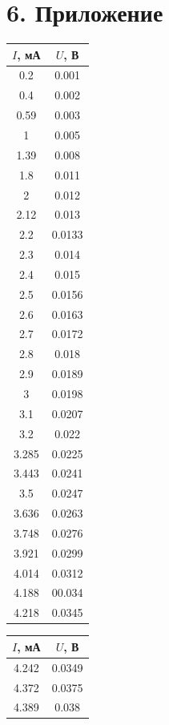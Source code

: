 \documentclass[a4paper,12pt]{report}
\begin{document}
\newpage
\section*{6. Приложение}
\begin{table}[H]
\begin{tabular}{|c|c|}
\hline
$I$, мА & $U$, В   \\ \hline
0.2   & 0.001  \\ \hline
0.4   & 0.002  \\ \hline
0.59  & 0.003  \\ \hline
1     & 0.005  \\ \hline
1.39  & 0.008  \\ \hline
1.8   & 0.011  \\ \hline
2     & 0.012  \\ \hline
2.12  & 0.013  \\ \hline
2.2   & 0.0133 \\ \hline
2.3   & 0.014  \\ \hline
2.4   & 0.015  \\ \hline
2.5   & 0.0156 \\ \hline
2.6   & 0.0163 \\ \hline
2.7   & 0.0172 \\ \hline
2.8   & 0.018  \\ \hline
2.9   & 0.0189 \\ \hline
3     & 0.0198 \\ \hline
3.1   & 0.0207 \\ \hline
3.2   & 0.022  \\ \hline
3.285 & 0.0225 \\ \hline
3.443 & 0.0241 \\ \hline
3.5   & 0.0247 \\ \hline
3.636 & 0.0263 \\ \hline
3.748 & 0.0276 \\ \hline
3.921 & 0.0299 \\ \hline
4.014 & 0.0312 \\ \hline
4.188 & 00.034 \\ \hline
4.218 & 0.0345 \\ \hline
\end{tabular}
\hspace{1.5 cm}
\begin{tabular}{|c|c|}
\hline
$I$, мА & $U$, В   \\ \hline
4.242 & 0.0349 \\ \hline
4.372 & 0.0375 \\ \hline
4.389 & 0.038  \\ \hline

\end{tabular}
\end{table}
\end{document}
